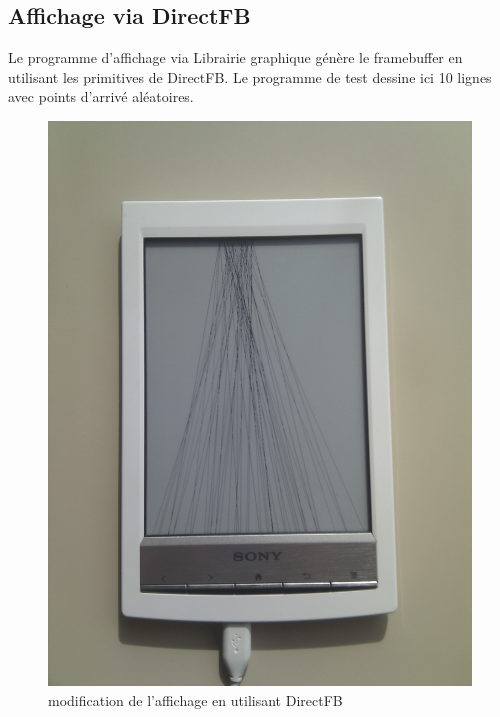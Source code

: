 \newpage

\subsection{Affichage via DirectFB}

Le programme d'affichage via Librairie graphique génère le framebuffer en utilisant les primitives de DirectFB.
Le programme de test dessine ici 10 lignes avec points d'arrivé aléatoires.

	\begin{figure}[h!]
		\begin{center}
			\includegraphics[scale=0.15]{screen_direct.jpg}
			\caption{modification de l'affichage en utilisant DirectFB}
		\end{center}
	\end{figure}

